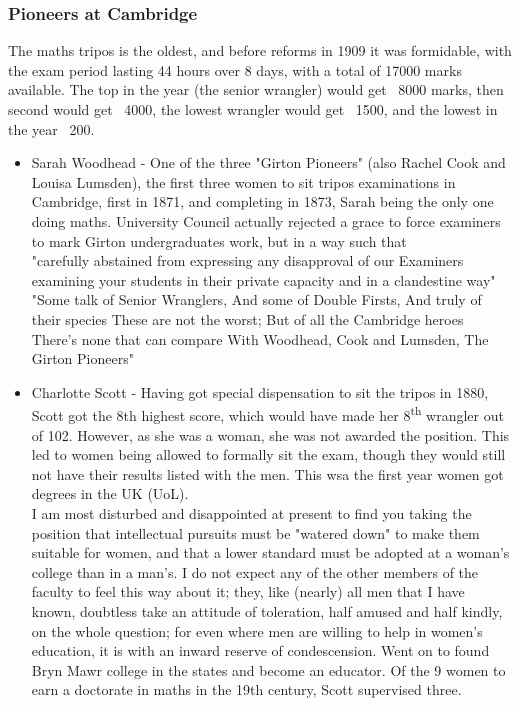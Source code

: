 \documentclass{article}
\begin{document}
\subsubsection*{Pioneers at Cambridge}
The maths tripos is the oldest, and before reforms in 1909 it was formidable, with the exam period lasting 44 hours over 8 days, with a total of 17000 marks available. The top in the year (the senior wrangler) would get ~8000 marks, then second would get ~4000, the lowest wrangler would get ~1500, and the lowest in the year ~200. 
\begin{itemize}
    \item Sarah Woodhead - One of the three "Girton Pioneers" (also Rachel Cook and Louisa Lumsden), the first three women to sit tripos examinations in Cambridge, first in 1871, and completing in 1873, Sarah being the only one doing maths. University Council actually rejected a grace to force examiners to mark Girton undergraduates work, but in a way such that \\
    \newline
    "carefully abstained from expressing any disapproval of our Examiners examining your students in their private capacity and in a clandestine way"
    \newline
    \newline
    "Some talk of Senior Wranglers,
    And some of Double Firsts,
    And truly of their species
    These are not the worst;
    But of all the Cambridge heroes
    There’s none that can compare
    With Woodhead, Cook and Lumsden,
    The Girton Pioneers"
    \newline
    
    
    \item Charlotte Scott - Having got special dispensation to sit the tripos in 1880, Scott got the 8th highest score, which would have made her 8\textsuperscript{th} wrangler out of 102. However, as she was a woman, she was not awarded the position. This led to women being allowed to formally sit the exam, though they would still not have their results listed with the men. This wsa the first year women got degrees in the UK (UoL). \\
    \newline
    I am most disturbed and disappointed at present to find you taking the position that intellectual pursuits must be "watered down" to make them suitable for women, and that a lower standard must be adopted at a woman's college than in a man's. I do not expect any of the other members of the faculty to feel this way about it; they, like (nearly) all men that I have known, doubtless take an attitude of toleration, half amused and half kindly, on the whole question; for even where men are willing to help in women's education, it is with an inward reserve of condescension.
    \newline
    Went on to found Bryn Mawr college in the states and become an educator. Of the 9 women to earn a doctorate in maths in the 19th century, Scott supervised three. 
    

\end{itemize}
\end{document}
